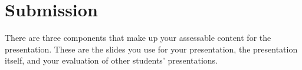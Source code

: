 \documentclass{csse4400}
\begin{document}
%
%



\section{Submission}
There are three components that make up your assessable content for the presentation.
These are the slides you use for your presentation,
the presentation itself, and your evaluation of other students' presentations.
\end{document}
